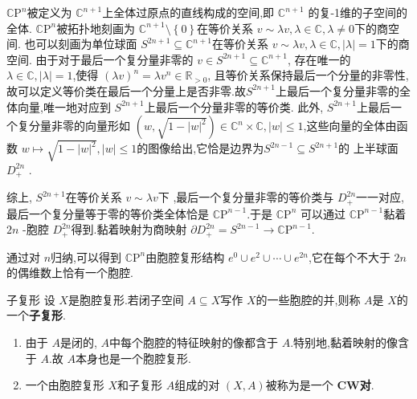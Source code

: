\documentclass[../../几何与拓扑.tex]{subfiles}
\begin{document}
\begin{example}[复射影空间]
    \(  \mathbb{C}  \mathrm{P}^{n}  \)被定义为 \(  \mathbb{C} ^{n+ 1}  \)上全体过原点的直线构成的空间,即 \(  \mathbb{C} ^{n+ 1}  \)   的复-1维的子空间的全体. \(  \mathbb{C} \mathrm{P}^{n}  \)被拓扑地刻画为 \(  \mathbb{C} ^{n+ 1}\setminus \left\{ 0 \right\}  \)在等价关系 \(  v \sim  \lambda v, \lambda \in \mathbb{C} , \lambda \neq 0  \)下的商空间. 也可以刻画为单位球面 \(  S^{2n+ 1}\subseteq \mathbb{C} ^{n+ 1}  \)在等价关系 \(  v\sim  \lambda v, \lambda \in \mathbb{C} ,\left|  \lambda  \right|= 1   \)下的商空间. 由于对于最后一个复分量非零的 \(  v \in S^{2n+ 1}\subseteq \mathbb{C} ^{n+ 1}  \), 存在唯一的 \(   \lambda \in \mathbb{C} ,\left|  \lambda  \right|= 1   \),使得  \(  \left(  \lambda v \right)^{n}=  \lambda v^{n} \in \mathbb{R} _{> 0}   \), 且等价关系保持最后一个分量的非零性,故可以定义等价类在最后一个分量上是否非零.故\(  S^{2n+ 1}  \)上最后一个复分量非零的全体向量,唯一地对应到 \(  S^{2n+ 1}  \)上最后一个分量非零的等价类.     此外, \(  S^{2n+ 1}  \)上最后一个复分量非零的向量形如 \(  \left( w, \sqrt{1-\left| w \right|^{2} } \right) \in \mathbb{C} ^{n}\times \mathbb{C} ,  \left| w \right|\le 1 \),这些向量的全体由函数 \(  w\mapsto \sqrt{1-\left| w \right|^{2} }, \left| w \right|\le 1   \)的图像给出,它恰是边界为\(  S^{2n-1}\subseteq S^{2n+ 1}  \)的  上半球面 \(  D_{+ }^{2n}  \) .

    综上, \(  S^{2n+ 1}  \)在等价关系 \(  v\sim  \lambda v  \)下 ,最后一个复分量非零的等价类与 \(  D_{+ }^{2n}  \)一一对应,  最后一个复分量等于零的等价类全体恰是 \(  \mathbb{C} \mathrm{P}^{n-1}  \).于是 \(  \mathbb{C} \mathrm{P}^{n}  \)  可以通过 \(  \mathbb{C} \mathrm{P}^{n-1}  \)黏着 \(  2n  \)  -胞腔 \(  D_{+ }^{2n}  \)得到.黏着映射为商映射 \(   \partial D_{+ }^{2n}= S^{2n-1}\to \mathbb{C} \mathrm{P}^{n-1}  \).
    
    通过对 \(  n  \)归纳,可以得到 \(  \mathbb{C} \mathrm{P}^{n}  \)由胞腔复形结构 \(  e^{0}\cup e^{2}\cup \cdots \cup e^{2n}  \),它在每个不大于 \(  2n  \)的偶维数上恰有一个胞腔.    
\end{example}

\hspace*{\fill} 

\begin{definition}{子复形}
    设 \(  X  \)是胞腔复形.若闭子空间 \(  A\subseteq X  \)写作 \(  X  \)的一些胞腔的并,则称 \(  A  \)是 \(  X  \)的一个\textbf{子复形}.     
\end{definition}

\begin{remark}
    \begin{enumerate}
        \item 由于 \(  A  \)是闭的, \(  A  \)中每个胞腔的特征映射的像都含于 \(  A  \).特别地,黏着映射的像含于 \(  A  \).故 \(  A  \)本身也是一个胞腔复形.     
        \item 一个由胞腔复形 \(  X  \)和子复形 \(  A  \)组成的对 \(  \left( X,A \right)   \)被称为是一个 \textbf{CW对}.   
    \end{enumerate}
    
\end{remark}
\end{document}
